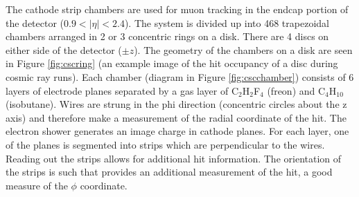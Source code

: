 The cathode strip chambers are used for muon tracking in the endcap portion of the detector ($0.9<|\eta|<2.4$). The system is divided up into 468 trapezoidal chambers arranged in 2 or 3 concentric rings on a disk. There are 4 discs on either side of the detector ($\pm z$). The geometry of the chambers on a disk are seen in Figure \ref{fig:cscring} (an example image of the hit occupancy of a disc during cosmic ray runs). Each chamber (diagram in Figure \ref{fig:cscchamber}) consists of 6 layers of electrode planes separated by a gas layer of C$_{2}$H$_{2}$F$_{4}$ (freon) and C$_{4}$H$_{10}$ (isobutane). Wires are strung in the phi direction (concentric circles about the z axis) and therefore make a measurement of the radial coordinate of the hit. The electron shower generates an image charge in cathode planes. For each layer, one of the planes is segmented into strips which are perpendicular to the wires. Reading out the strips allows for additional hit information. The orientation of the strips is such that provides an additional measurement of the hit, a good measure of the $\phi$ coordinate. \cite{cscperformance}


